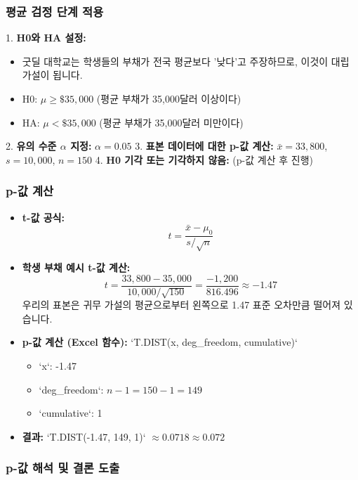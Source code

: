 \documentclass[11pt,a4paper]{article}
\begin{document}
\subsubsection*{평균 검정 단계 적용}

1.  \textbf{H0와 HA 설정:}
    \begin{itemize}
        \item 굿딜 대학교는 학생들의 부채가 전국 평균보다 '낮다'고 주장하므로, 이것이 대립 가설이 됩니다.
        \item H0: $\mu \ge \$35,000$ (평균 부채가 35,000달러 이상이다)
        \item HA: $\mu < \$35,000$ (평균 부채가 35,000달러 미만이다)
    \end{itemize}
2.  \textbf{유의 수준 $\alpha$ 지정:} $\alpha = 0.05$
3.  \textbf{표본 데이터에 대한 p-값 계산:} $\bar{x} = 33,800$, $s = 10,000$, $n = 150$
4.  \textbf{H0 기각 또는 기각하지 않음:} (p-값 계산 후 진행)

\subsubsection*{p-값 계산}

\begin{itemize}
    \item \textbf{t-값 공식:}
    \[ t = \frac{\bar{x} - \mu_0}{s / \sqrt{n}} \]
    \item \textbf{학생 부채 예시 t-값 계산:}
    \[ t = \frac{33,800 - 35,000}{10,000 / \sqrt{150}} = \frac{-1,200}{816.496} \approx -1.47 \]
    우리의 표본은 귀무 가설의 평균으로부터 왼쪽으로 1.47 표준 오차만큼 떨어져 있습니다.
    \item \textbf{p-값 계산 (Excel 함수):} `T.DIST(x, deg_freedom, cumulative)`
        \begin{itemize}
            \item `x`: -1.47
            \item `deg_freedom`: $n-1 = 150-1 = 149$
            \item `cumulative`: 1
        \end{itemize}
    \item \textbf{결과:} `T.DIST(-1.47, 149, 1)` $\approx 0.0718 \approx 0.072$
\end{itemize}

\subsubsection*{p-값 해석 및 결론 도출}
\end{document}
